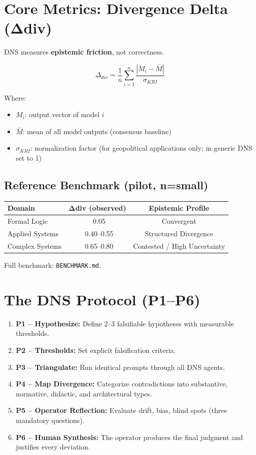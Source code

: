 \documentclass[12pt]{article}
\begin{document}
\section{Core Metrics: Divergence Delta (Δdiv)}

DNS measures \textbf{epistemic friction}, not correctness.

\[
\Delta_{div} = \frac{1}{n} \sum_{i=1}^{n} \frac{|M_i - \bar{M}|}{\sigma_{KRI}}
\]

Where:
\begin{itemize}
    \item \(M_i\): output vector of model \(i\)
    \item \(\bar{M}\): mean of all model outputs (consensus baseline)
    \item \(\sigma_{KRI}\): normalization factor (for geopolitical applications only; in generic DNS set to 1)
\end{itemize}

\subsection*{Reference Benchmark (pilot, n=small)}

\begin{center}
\begin{tabular}{lcc}
\toprule
\textbf{Domain} & \textbf{Δdiv (observed)} & \textbf{Epistemic Profile} \\
\midrule
Formal Logic & ~0.05 & Convergent \\
Applied Systems & ~0.40–0.55 & Structured Divergence \\
Complex Systems & ~0.65–0.80 & Contested / High Uncertainty \\
\bottomrule
\end{tabular}
\end{center}

Full benchmark: \texttt{BENCHMARK.md}.

\section{The DNS Protocol (P1–P6)}

\begin{enumerate}
    \item \textbf{P1 – Hypothesize:} Define 2–3 falsifiable hypotheses with measurable thresholds.
    \item \textbf{P2 – Thresholds:} Set explicit falsification criteria.
    \item \textbf{P3 – Triangulate:} Run identical prompts through all DNS agents.
    \item \textbf{P4 – Map Divergence:} Categorize contradictions into substantive, normative, didactic, and architectural types.
    \item \textbf{P5 – Operator Reflection:} Evaluate drift, bias, blind spots (three mandatory questions).
    \item \textbf{P6 – Human Synthesis:} The operator produces the final judgment and justifies every deviation.
\end{enumerate}
\end{document}
